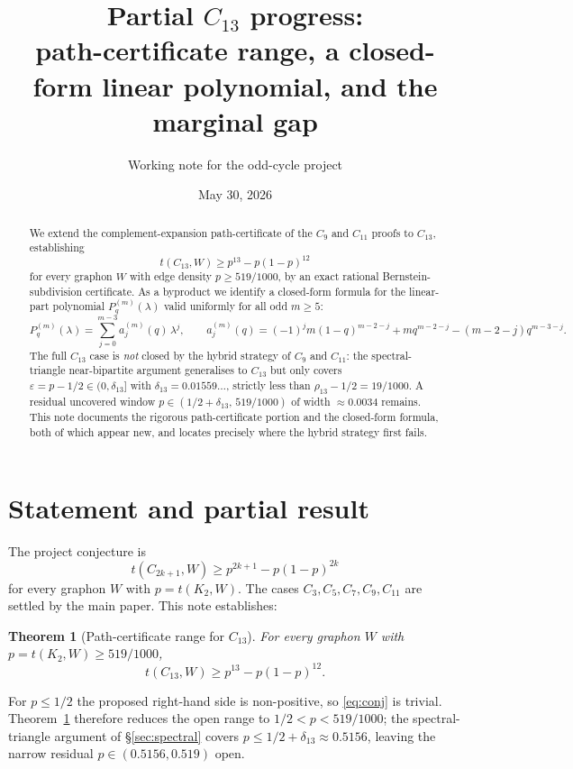 \documentclass[11pt]{article}
\title{Partial $C_{13}$ progress: \\
\large path-certificate range, a closed-form linear polynomial, and the marginal gap}
\author{Working note for the odd-cycle project}
\date{May 30, 2026}
\newtheorem{theorem}{Theorem}[section]
\newcommand{\eps}{\varepsilon}
\begin{document}
\maketitle

\begin{abstract}
We extend the complement-expansion path-certificate of the $C_9$ and $C_{11}$ proofs to $C_{13}$, establishing
\[
        t(C_{13}, W) \ge p^{13} - p(1-p)^{12}
\]
for every graphon $W$ with edge density $p \ge 519/1000$, by an exact rational Bernstein-subdivision certificate.  As a byproduct we identify a closed-form formula for the linear-part polynomial $P_q^{(m)}(\lambda)$ valid uniformly for all odd $m \ge 5$:
\[
        P_q^{(m)}(\lambda) = \sum_{j=0}^{m-3} a_j^{(m)}(q)\, \lambda^j,
        \qquad
        a_j^{(m)}(q) = (-1)^j m (1-q)^{m-2-j} + m q^{m-2-j} - (m-2-j) q^{m-3-j}.
\]
The full $C_{13}$ case is \emph{not} closed by the hybrid strategy of $C_9$ and $C_{11}$: the spectral-triangle near-bipartite argument generalises to $C_{13}$ but only covers $\eps = p - 1/2 \in (0, \delta_{13}]$ with $\delta_{13} = 0.01559\ldots$, strictly less than $\rho_{13} - 1/2 = 19/1000$.  A residual uncovered window $p \in (1/2 + \delta_{13},\, 519/1000)$ of width $\approx 0.0034$ remains.  This note documents the rigorous path-certificate portion and the closed-form formula, both of which appear new, and locates precisely where the hybrid strategy first fails.
\end{abstract}

\section{Statement and partial result}

The project conjecture is
\begin{equation}\label{eq:conj}
        t(C_{2k+1}, W) \ge p^{2k+1} - p(1-p)^{2k}
\end{equation}
for every graphon $W$ with $p = t(K_2, W)$.  The cases $C_3, C_5, C_7, C_9, C_{11}$ are settled by the main paper.  This note establishes:

\begin{theorem}[Path-certificate range for $C_{13}$]\label{thm:C13-path}
For every graphon $W$ with $p = t(K_2, W) \ge 519/1000$,
\[
        t(C_{13}, W) \ge p^{13} - p(1-p)^{12}.
\]
\end{theorem}

For $p \le 1/2$ the proposed right-hand side is non-positive, so \eqref{eq:conj} is trivial.  Theorem~\ref{thm:C13-path} therefore reduces the open range to $1/2 < p < 519/1000$; the spectral-triangle argument of \S\ref{sec:spectral} covers $p \le 1/2 + \delta_{13} \approx 0.5156$, leaving the narrow residual $p \in (0.5156, 0.519)$ open.
\end{document}
